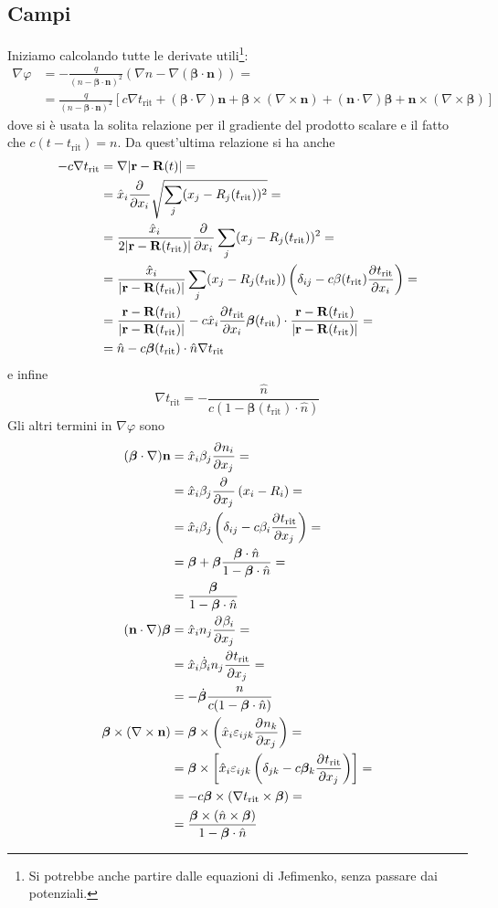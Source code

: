 \documentclass[a4paper,11pt]{article}
\renewcommand{\vec}[1]{\mathbf{#1}}
\renewcommand{\t}{t_{\mathrm{rit}}}
\begin{document}
\subsection{Campi}
Iniziamo calcolando tutte le derivate utili\footnote{Si potrebbe anche partire dalle equazioni di Jefimenko, senza passare dai potenziali.}:
\begin{align*}
\nabla\varphi&=-\frac{q}{(n-\bm{\beta}\cdot\vec{n})^2}\left(\nabla n-\nabla(\bm{\beta}\cdot\vec{n})\right)=\\&=\frac{q}{(n-\bm{\beta}\cdot\vec{n})^2}\left[c\nabla\t+(\bm{\beta}\cdot\nabla)\vec{n}+\bm\beta\times(\nabla\times\vec{n})+(\vec{n}\cdot\nabla)\bm{\beta}+\vec n\times(\nabla\times\bm{\beta})\right]
\end{align*}
dove si è usata la solita relazione per il gradiente del prodotto scalare e il fatto che $c(t-\t)=n$. Da quest'ultima relazione si ha anche
\begin{align*}
	-c\nabla\t&=\nabla|\vec{r}-\vec{R}(t)|=\\&=\hat{x}_i\pder{}{x_i}\sqrt{\sum_{j}(x_j-R_j(\t))^2}=\\&=\frac{\hat{x}_i}{2|\vec{r}-\vec{R}(\t)|}\pder{}{x_i}\sum_{j}(x_j-R_j(\t))^2=\\&=\frac{\hat{x}_i}{|\vec{r}-\vec{R}(\t)|}\sum_{j}(x_j-R_j(\t))\left(\delta_{ij}-c\beta(\t)\pder{\t}{x_i}\right)=\\&=\frac{\vec{r}-\vec{R}(\t)}{|\vec{r}-\vec{R}(\t)|}-c\hat{x}_i\pder{\t}{x_i}\bm{\beta}(\t)\cdot\frac{\vec{r}-\vec{R}(\t)}{|\vec{r}-\vec{R}(\t)|}=\\&=\hat{n}-c\bm{\beta}(\t)\cdot\hat{n}\nabla\t
\end{align*}
e infine
\[\nabla\t=-\frac{\hat{n}}{c(1-\bm{\beta}(\t)\cdot\hat{n})}\]
Gli altri termini in $\nabla\varphi$ sono
\begin{align*}
	(\bm{\beta}\cdot\nabla)\vec{n}&=\hat{x}_i\beta_j\pder{n_i}{x_j}=\\&=\hat{x}_i\beta_j\pder{}{x_j}\left(x_i-R_i\right)=\\&=\hat{x}_i\beta_j\left(\delta_{ij}-c\beta_i\pder{\t}{x_j}\right)=\\&=\bm{\beta}+\bm{\beta}\frac{\bm{\beta}\cdot\hat{n}}{1-\bm{\beta}\cdot\hat{n}}=\\&=\frac{\bm{\beta}}{1-\bm{\beta}\cdot\hat{n}}
	\\(\vec{n}\cdot\nabla)\bm{\beta}&=\hat{x}_in_j\pder{\beta_i}{x_j}=\\&=\hat{x}_i\dot{\beta}_in_j\pder{\t}{x_j}=\\&=-\dot{\bm{\beta}}\frac{n}{c(1-\bm{\beta}\cdot\hat{n})}
	\\\bm{\beta}\times(\nabla\times\vec{n})&=\bm{\beta}\times\left(\hat{x}_i\varepsilon_{ijk}\pder{n_k}{x_j}\right)=\\&=\bm{\beta}\times\left[\hat{x}_i\varepsilon_{ijk}\left(\delta_{jk}-c\bm{\beta}_k\pder{\t}{x_j}\right)\right]=\\&=-c\bm{\beta}\times(\nabla\t\times\bm{\beta})=\\&=\frac{\bm{\beta}\times(\hat{n}\times\bm{\beta})}{1-\bm{\beta}\cdot\hat{n}}
\end{align*}
\end{document}
